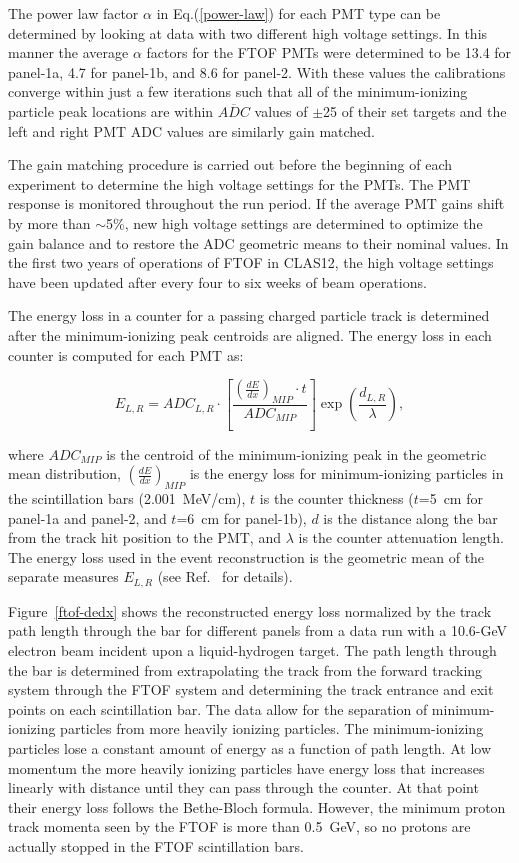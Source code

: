 \documentclass[3p,times,twocolumn]{elsarticle}
\begin{document}
The power law factor $\alpha$ in Eq.(\ref{power-law}) for each PMT type can be determined by looking
at data with two different high voltage settings. In this manner the average $\alpha$ factors for the
FTOF PMTs were determined to be 13.4 for panel-1a, 4.7 for panel-1b, and 8.6 for panel-2. With these
values the calibrations converge within just a few iterations such that all of the minimum-ionizing particle
peak locations are within $\overline{ADC}$ values of $\pm$25 of their set targets and the left and right
PMT ADC values are similarly gain matched.

The gain matching procedure is carried out before the beginning of each experiment to determine the
high voltage settings for the PMTs. The PMT response is monitored throughout the run period. If the
average PMT gains shift by more than $\sim$5\%, new high voltage settings are determined to optimize
the gain balance and to restore the ADC geometric means to their nominal values. In the first two years of
operations of FTOF in CLAS12, the high voltage settings have been updated after every four to six weeks
of beam operations.

The energy loss in a counter for a passing charged particle track is determined after the minimum-ionizing
peak centroids are aligned. The energy loss in each counter is computed for each PMT as:

\begin{equation}
E_{L,R} = ADC_{L,R} \cdot \left [ \frac{\left( \frac{dE}{dx} \right)_{MIP} \cdot t}{ADC_{MIP}}\right ]
\exp\left(\frac{d_{L,R}}{\lambda}\right),
\end{equation}

\noindent
where $ADC_{MIP}$ is the centroid of the minimum-ionizing peak in the geometric mean distribution,
$\left( \frac{dE}{dx} \right)_{MIP}$ is the energy loss for minimum-ionizing particles in the scintillation
bars (2.001~MeV/cm), $t$ is the counter thickness ($t$=5~cm for panel-1a and panel-2, and $t$=6~cm
for panel-1b), $d$ is the distance along the bar from the track hit position to the PMT, and $\lambda$ is
the counter attenuation length. The energy loss used in the event reconstruction is the geometric mean of
the separate measures $E_{L,R}$ (see Ref.~\cite{recon-nim} for details).

Figure~\ref{ftof-dedx} shows the reconstructed energy loss normalized by the track path length through
the bar for different panels from a data run with a 10.6-GeV electron beam incident upon a liquid-hydrogen
target. The path length through the bar is determined from extrapolating the track from the forward
tracking system through the FTOF system and determining the track entrance and exit points on each
scintillation bar. The data allow for the separation of minimum-ionizing particles from more heavily ionizing
particles. The minimum-ionizing particles lose a constant amount of energy as a function of path length. At
low momentum the more heavily ionizing particles have energy loss that increases linearly with distance until
they can pass through the counter. At that point their energy loss follows the Bethe-Bloch formula. However,
the minimum proton track momenta seen by the FTOF is more than 0.5~GeV, so no protons are actually stopped
in the FTOF scintillation bars.
\end{document}
